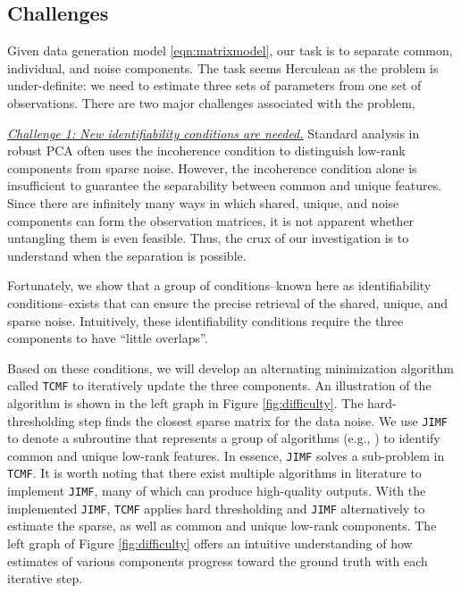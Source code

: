 \documentclass[twoside,11pt]{article}
\def\name{\texttt{TCMF}\xspace}
\def\inneralg{\texttt{JIMF}\xspace}
\begin{document}
\subsection{Challenges}

Given data generation model \eqref{eqn:matrixmodel}, our task is to separate common, individual, and noise components. The task seems Herculean as the problem is under-definite: we need to estimate three sets of parameters from one set of observations. There are two major challenges associated with the problem,

\underline{\textit{Challenge 1: New identifiability conditions are needed.}} Standard analysis in robust PCA \citep{robustpca,nonconvexrobustpca} often uses the incoherence condition to distinguish low-rank components from sparse noise. However, the incoherence condition alone is insufficient to guarantee the separability between common and unique features. Since there are infinitely many ways in which shared, unique, and noise components can form the observation matrices, it is not apparent whether untangling them is even feasible. Thus, the crux of our investigation is to understand when the separation is possible. 

Fortunately, we show that a group of conditions--known here as identifiability conditions--exists that can ensure the precise retrieval of the shared, unique, and sparse noise. Intuitively, these identifiability conditions require the three components to have ``little overlaps''. 

Based on these conditions, we will develop an alternating minimization algorithm called \name to iteratively update the three components. An illustration of the algorithm is shown in the left graph in Figure \ref{fig:difficulty}. The hard-thresholding step finds the closest sparse matrix for the data noise. We use \inneralg to denote a subroutine that represents a group of algorithms (e.g., \citep{jive,personalizedpca}) to identify common and unique low-rank features. In essence, \inneralg solves a sub-problem in \name. It is worth noting that there exist multiple algorithms in literature to implement \inneralg, many of which can produce high-quality outputs. With the implemented \inneralg, \name applies hard thresholding and \inneralg alternatively to estimate the sparse, as well as common and unique low-rank components. The left graph of Figure \ref{fig:difficulty} offers an intuitive understanding of how estimates of various components progress toward the ground truth with each iterative step. 
\end{document}

